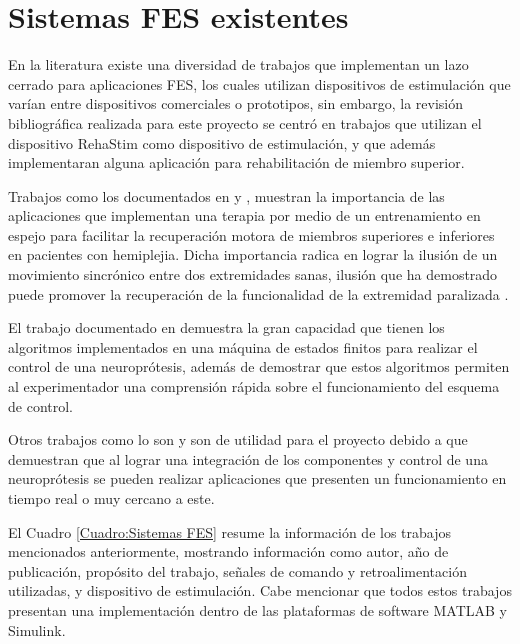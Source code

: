\section{Sistemas FES existentes}
En la literatura existe una diversidad de trabajos que implementan un lazo cerrado para aplicaciones FES, los cuales utilizan dispositivos de estimulación que varían entre dispositivos comerciales o prototipos, sin embargo, la revisión bibliográfica realizada para este proyecto se centró en trabajos que utilizan el dispositivo RehaStim como dispositivo de estimulación, y que además implementaran alguna aplicación para rehabilitación de miembro superior.

Trabajos como los documentados en \cite{Salchow2016} y \cite{Kim2015}, muestran la importancia de las aplicaciones que implementan una terapia por medio de un entrenamiento en espejo para facilitar la recuperación motora de miembros superiores e inferiores en pacientes con hemiplejia. Dicha importancia radica en lograr la ilusión de un movimiento sincrónico entre dos extremidades sanas, ilusión que ha demostrado puede promover la recuperación de la funcionalidad de la extremidad paralizada \cite{Deconinck2015}.

El trabajo documentado en \cite{Sun2014} demuestra la gran capacidad que tienen los algoritmos implementados en una máquina de estados finitos para realizar el control de una neuroprótesis, además de demostrar que estos algoritmos permiten al experimentador una comprensión rápida sobre el funcionamiento del esquema de control.

Otros trabajos como lo son \cite{Simonsen2017} y \cite{Woods2018} son de utilidad para el proyecto debido a que demuestran que al lograr una integración de los componentes y control de una neuroprótesis se pueden realizar aplicaciones que presenten un funcionamiento en tiempo real o muy cercano a este.

El Cuadro \ref{Cuadro:Sistemas FES} resume la información de los trabajos mencionados anteriormente, mostrando información como autor, año de publicación, propósito del trabajo, señales de comando y retroalimentación utilizadas, y dispositivo de estimulación. Cabe mencionar que todos estos trabajos presentan una implementación dentro de las plataformas de software MATLAB\textregistered \; y Simulink\textregistered.

